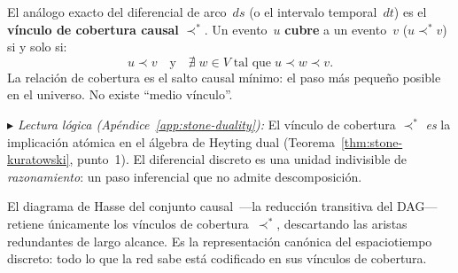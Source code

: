 \documentclass[11pt, a4paper, openany]{book}
\newcommand{\covers}{\prec^{\!*}}
\newcommand{\stoneref}[1]{%
  \smallskip\noindent
  {\small\color{structure!70}\textit{$\blacktriangleright$ Lectura
  l\'ogica (Ap\'endice~\ref{app:stone-duality}):} #1}%
  \smallskip}
\begin{document}
\begin{definition}
\label{def:covering}
El an\'alogo exacto del diferencial de arco~$ds$ (o el intervalo
temporal~$dt$) es el \textbf{v\'inculo de cobertura causal}
$\covers$. Un evento~$u$ \textbf{cubre} a un evento~$v$
($u \covers v$) si y solo si:
\[
  u \prec v
  \quad\text{y}\quad
  \nexists\; w \in V \;\text{tal que}\; u \prec w \prec v.
\]
La relaci\'on de cobertura es el salto causal m\'inimo: el paso
m\'as peque\~no posible en el universo. No existe ``medio v\'inculo''.
\end{definition}

\stoneref{El v\'inculo de cobertura $\covers$ \emph{es} la
implicaci\'on at\'omica en el \'algebra de Heyting dual
(Teorema~\ref{thm:stone-kuratowski}, punto~1). El diferencial
discreto es una unidad indivisible de \emph{razonamiento}: un paso
inferencial que no admite descomposici\'on.}

\noindent
El diagrama de Hasse del conjunto
causal~\cite{davey2002}---la reducci\'on transitiva del DAG---retiene
\'unicamente los v\'inculos de cobertura~$\covers$, descartando
las aristas redundantes de largo alcance. Es la representaci\'on can\'onica del espaciotiempo
discreto: todo lo que la red sabe est\'a codificado en sus v\'inculos
de cobertura.
\end{document}
